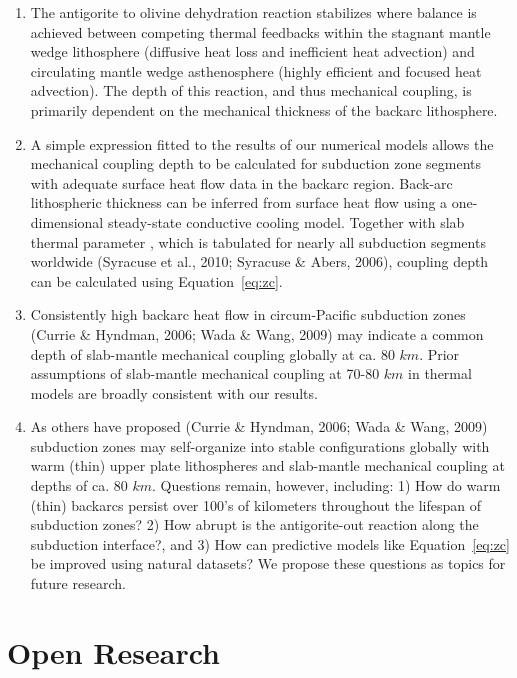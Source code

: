 \documentclass[draft,linenumbers]{agujournal2018}
\begin{document}
\begin{enumerate}
\def\labelenumi{\arabic{enumi}.}
\item
  The antigorite to olivine dehydration reaction stabilizes where
  balance is achieved between competing thermal feedbacks within the
  stagnant mantle wedge lithosphere (diffusive heat loss and inefficient
  heat advection) and circulating mantle wedge asthenosphere (highly
  efficient and focused heat advection). The depth of this reaction, and
  thus mechanical coupling, is primarily dependent on the mechanical
  thickness of the backarc lithosphere.
\item
  A simple expression fitted to the results of our numerical models
  allows the mechanical coupling depth to be calculated for subduction
  zone segments with adequate surface heat flow data in the backarc
  region. Back-arc lithospheric thickness can be inferred from surface
  heat flow using a one-dimensional steady-state conductive cooling
  model. Together with slab thermal parameter , which is tabulated for
  nearly all subduction segments worldwide (Syracuse et al., 2010;
  Syracuse \& Abers, 2006), coupling depth can be calculated using
  Equation~\ref{eq:zc}.
\item
  Consistently high backarc heat flow in circum-Pacific subduction zones
  (Currie \& Hyndman, 2006; Wada \& Wang, 2009) may indicate a common
  depth of slab-mantle mechanical coupling globally at ca. 80 \(km\).
  Prior assumptions of slab-mantle mechanical coupling at 70-80 \(km\)
  in thermal models are broadly consistent with our results.
\item
  As others have proposed (Currie \& Hyndman, 2006; Wada \& Wang, 2009)
  subduction zones may self-organize into stable configurations globally
  with warm (thin) upper plate lithospheres and slab-mantle mechanical
  coupling at depths of ca. 80 \(km\). Questions remain, however,
  including: 1) How do warm (thin) backarcs persist over 100's of
  kilometers throughout the lifespan of subduction zones? 2) How abrupt
  is the antigorite-out reaction along the subduction interface?, and 3)
  How can predictive models like Equation~\ref{eq:zc} be improved using
  natural datasets? We propose these questions as topics for future
  research.
\end{enumerate}

\section{Open Research}
\end{document}
